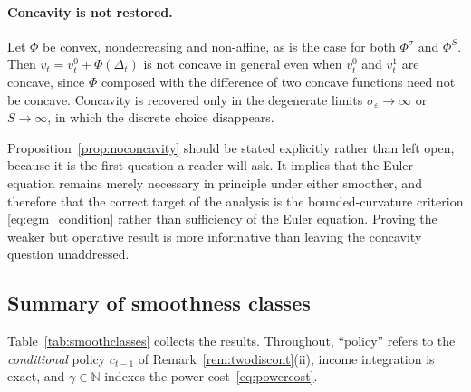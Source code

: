 \paragraph{Concavity is not restored.}

\begin{proposition}
\label{prop:noconcavity}
Let $\Phi$ be convex, nondecreasing and non-affine, as is the case for both
$\Phi^{\sigma}$ and $\Phi^{S}$. Then $v_t=v_t^{0}+\Phi(\Delta_t)$ is not concave in
general even when $v_t^{0}$ and $v_t^{1}$ are concave, since $\Phi$ composed with the
difference of two concave functions need not be concave. Concavity is recovered only in
the degenerate limits $\sigma_\varepsilon\to\infty$ or $S\to\infty$, in which the
discrete choice disappears.
\end{proposition}

Proposition~\ref{prop:noconcavity} should be stated explicitly rather than left open,
because it is the first question a reader will ask. It implies that the Euler equation
remains merely necessary in principle under either smoother, and therefore that the
correct target of the analysis is the bounded-curvature criterion
\eqref{eq:egm_condition} rather than sufficiency of the Euler equation. Proving the
weaker but operative result is more informative than leaving the concavity question
unaddressed.

\subsection{Summary of smoothness classes}
\label{subsec:smooth_summary}

Table~\ref{tab:smoothclasses} collects the results. Throughout, ``policy'' refers to
the \emph{conditional} policy $c_{t-1}$ of Remark~\ref{rem:twodiscont}(ii), income
integration is exact, and $\gamma\in\mathbb{N}$ indexes the power
cost~\eqref{eq:powercost}.

